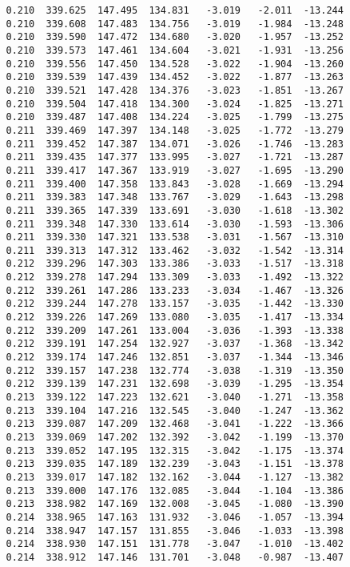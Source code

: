 \begin{verbatim}
   0.210  339.625  147.495  134.831   -3.019   -2.011  -13.244
   0.210  339.608  147.483  134.756   -3.019   -1.984  -13.248
   0.210  339.590  147.472  134.680   -3.020   -1.957  -13.252
   0.210  339.573  147.461  134.604   -3.021   -1.931  -13.256
   0.210  339.556  147.450  134.528   -3.022   -1.904  -13.260
   0.210  339.539  147.439  134.452   -3.022   -1.877  -13.263
   0.210  339.521  147.428  134.376   -3.023   -1.851  -13.267
   0.210  339.504  147.418  134.300   -3.024   -1.825  -13.271
   0.210  339.487  147.408  134.224   -3.025   -1.799  -13.275
   0.211  339.469  147.397  134.148   -3.025   -1.772  -13.279
   0.211  339.452  147.387  134.071   -3.026   -1.746  -13.283
   0.211  339.435  147.377  133.995   -3.027   -1.721  -13.287
   0.211  339.417  147.367  133.919   -3.027   -1.695  -13.290
   0.211  339.400  147.358  133.843   -3.028   -1.669  -13.294
   0.211  339.383  147.348  133.767   -3.029   -1.643  -13.298
   0.211  339.365  147.339  133.691   -3.030   -1.618  -13.302
   0.211  339.348  147.330  133.614   -3.030   -1.593  -13.306
   0.211  339.330  147.321  133.538   -3.031   -1.567  -13.310
   0.211  339.313  147.312  133.462   -3.032   -1.542  -13.314
   0.212  339.296  147.303  133.386   -3.033   -1.517  -13.318
   0.212  339.278  147.294  133.309   -3.033   -1.492  -13.322
   0.212  339.261  147.286  133.233   -3.034   -1.467  -13.326
   0.212  339.244  147.278  133.157   -3.035   -1.442  -13.330
   0.212  339.226  147.269  133.080   -3.035   -1.417  -13.334
   0.212  339.209  147.261  133.004   -3.036   -1.393  -13.338
   0.212  339.191  147.254  132.927   -3.037   -1.368  -13.342
   0.212  339.174  147.246  132.851   -3.037   -1.344  -13.346
   0.212  339.157  147.238  132.774   -3.038   -1.319  -13.350
   0.212  339.139  147.231  132.698   -3.039   -1.295  -13.354
   0.213  339.122  147.223  132.621   -3.040   -1.271  -13.358
   0.213  339.104  147.216  132.545   -3.040   -1.247  -13.362
   0.213  339.087  147.209  132.468   -3.041   -1.222  -13.366
   0.213  339.069  147.202  132.392   -3.042   -1.199  -13.370
   0.213  339.052  147.195  132.315   -3.042   -1.175  -13.374
   0.213  339.035  147.189  132.239   -3.043   -1.151  -13.378
   0.213  339.017  147.182  132.162   -3.044   -1.127  -13.382
   0.213  339.000  147.176  132.085   -3.044   -1.104  -13.386
   0.213  338.982  147.169  132.008   -3.045   -1.080  -13.390
   0.214  338.965  147.163  131.932   -3.046   -1.057  -13.394
   0.214  338.947  147.157  131.855   -3.046   -1.033  -13.398
   0.214  338.930  147.151  131.778   -3.047   -1.010  -13.402
   0.214  338.912  147.146  131.701   -3.048   -0.987  -13.407

\end{verbatim}
